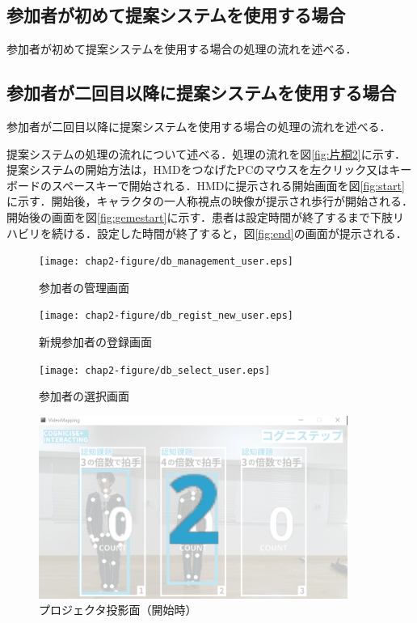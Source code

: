 \subsection{参加者が初めて提案システムを使用する場合}
参加者が初めて提案システムを使用する場合の処理の流れを述べる．

\subsection{参加者が二回目以降に提案システムを使用する場合}
参加者が二回目以降に提案システムを使用する場合の処理の流れを述べる．


提案システムの処理の流れについて述べる．処理の流れを図\ref{fig:片桐2}に示す．
提案システムの開始方法は，HMDをつなげたPCのマウスを左クリック又はキーボードのスペースキーで開始される．HMDに提示される開始画面を図\ref{fig:start}に示す．開始後，キャラクタの一人称視点の映像が提示され歩行が開始される．開始後の画面を図\ref{fig:gemestart}に示す．患者は設定時間が終了するまで下肢リハビリを続ける．設定した時間が終了すると，図\ref{fig:end}の画面が提示される．
\fi

\begin{figure}[tbp]
	\centering
			\texttt{[image: chap2-figure/db\_management\_user.eps]}
	\caption{参加者の管理画面}
	\label{fig:db_management_user}
\end{figure}

\begin{figure}[tbp]
	\centering
			\texttt{[image: chap2-figure/db\_regist\_new\_user.eps]}
	\caption{新規参加者の登録画面}
	\label{fig:db_regist_new_user}
\end{figure}

\begin{figure}[tbp]
	\centering
			\texttt{[image: chap2-figure/db\_select\_user.eps]}
	\caption{参加者の選択画面}
	\label{fig:db_select_user}
\end{figure}

\begin{figure}[tbp]
	\centering
			\includegraphics[width=0.9\textwidth]{chap2-figure/vm_start.eps}
	\caption{プロジェクタ投影面（開始時）}
	\label{fig:vm_start}
\end{figure}

